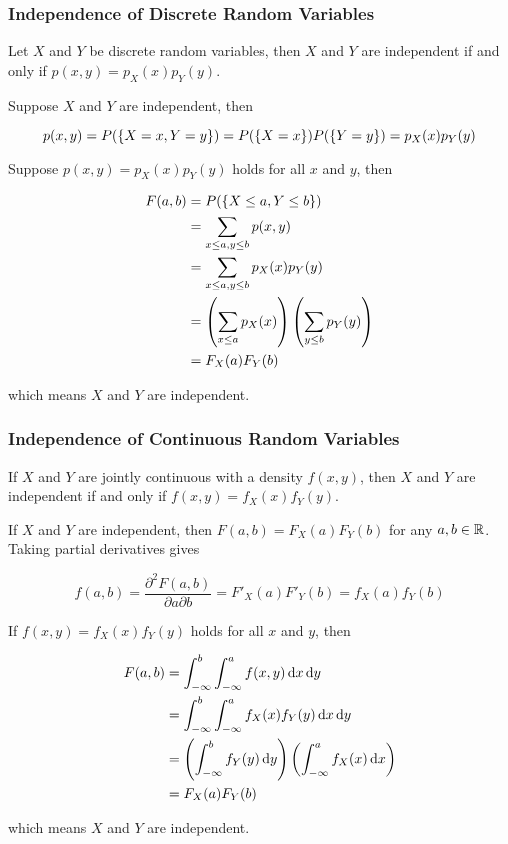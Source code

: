 \documentclass[a4paper,12pt]{article}
\begin{document}
\subsubsection{Independence of Discrete Random Variables}
\begin{pst}
  Let $X$ and $Y$ be discrete random variables, then $X$ and $Y$ are independent if and only if $p(x,y)=p_{X}(x)p_{Y}(y)$.\n

  \prf\arr Suppose $X$ and $Y$ are independent, then

  $$p(x,y)=P(\left\{ X=x,Y=y\right\})=P(\left\{ X=x\right\})P(\left\{ Y=y\right\})=p_{X}(x)p_{Y}(y)$$\s

  \arl Suppose $p(x,y)=p_{X}(x)p_{Y}(y)$ holds for all $x$ and $y$, then

  $$\begin{aligned}
    F(a,b)&=P(\left\{ X\leq a,Y\leq b\right\})\\
    &=\sum_{x\leq a,y\leq b}p(x,y)\\
    &=\sum_{x\leq a,y\leq b}p_{X}(x)p_{Y}(y)\\
    &=\left( \sum_{x\leq a}p_{X}(x)\right)\left( \sum_{y\leq b}p_{Y}(y)\right)\\
    &=F_{X}(a)F_{Y}(b)
  \end{aligned}$$\s

  which means $X$ and $Y$ are independent.
\end{pst}

\subsubsection{Independence of Continuous Random Variables}
\begin{pst}
  If $X$ and $Y$ are jointly continuous with a density $f(x,y)$, then $X$ and $Y$ are independent if and only if $f(x,y)=f_{X}(x)f_{Y}(y)$.\n

  \prf\arr If $X$ and $Y$ are independent, then $F(a,b)=F_{X}(a)F_{Y}(b)$ for any $a,b\in\mathbb{R}$. Taking partial derivatives gives

  $$f(a,b)=\frac{\partial^{2}F(a,b)}{\partial a\partial b}=F'_{X}(a)F'_{Y}(b)=f_{X}(a)f_{Y}(b)$$\s

  \arl If $f(x,y)=f_{X}(x)f_{Y}(y)$ holds for all $x$ and $y$, then

  $$\begin{aligned}[t]
    F(a,b)&=\int_{-\infty}^{b}\int_{-\infty}^{a}f(x,y)\,\mathrm{d} x\,\mathrm{d} y\\
    &=\int_{-\infty}^{b}\int_{-\infty}^{a}f_{X}(x)f_{Y}(y)\,\mathrm{d} x\,\mathrm{d} y\\
    &=\left( \int_{-\infty}^{b}f_{Y}(y)\,\mathrm{d} y\right)\left( \int_{-\infty}^{a}f_{X}(x)\,\mathrm{d} x\right)\\
    &=F_{X}(a)F_{Y}(b)
  \end{aligned}$$\s

  which means $X$ and $Y$ are independent.
\end{pst}\n
\end{document}
